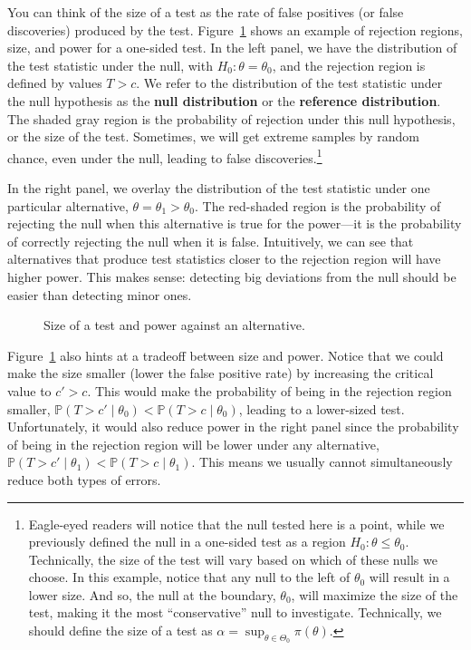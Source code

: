 \documentclass[
  13pt,
  letterpaper,
  DIV=11,
  numbers=noendperiod]{scrreprt}
\renewcommand{\P}{\mathbb{P}}
\theoremstyle{definition}
\theoremstyle{definition}
\theoremstyle{plain}
\theoremstyle{remark}
\begin{document}
You can think of the size of a test as the rate of false positives (or
false discoveries) produced by the test. Figure~\ref{fig-size-power}
shows an example of rejection regions, size, and power for a one-sided
test. In the left panel, we have the distribution of the test statistic
under the null, with \(H_0: \theta = \theta_0\), and the rejection
region is defined by values \(T > c\). We refer to the distribution of
the test statistic under the null hypothesis as the \textbf{null
distribution} or the \textbf{reference distribution}. The shaded gray
region is the probability of rejection under this null hypothesis, or
the size of the test. Sometimes, we will get extreme samples by random
chance, even under the null, leading to false discoveries.\footnote{Eagle-eyed
  readers will notice that the null tested here is a point, while we
  previously defined the null in a one-sided test as a region
  \(H_0: \theta \leq \theta_0\). Technically, the size of the test will
  vary based on which of these nulls we choose. In this example, notice
  that any null to the left of \(\theta_0\) will result in a lower size.
  And so, the null at the boundary, \(\theta_0\), will maximize the size
  of the test, making it the most ``conservative'' null to investigate.
  Technically, we should define the size of a test as
  \(\alpha = \sup_{\theta \in \Theta_0} \pi(\theta)\).}

In the right panel, we overlay the distribution of the test statistic
under one particular alternative, \(\theta = \theta_1 > \theta_0\). The
red-shaded region is the probability of rejecting the null when this
alternative is true for the power---it is the probability of correctly
rejecting the null when it is false. Intuitively, we can see that
alternatives that produce test statistics closer to the rejection region
will have higher power. This makes sense: detecting big deviations from
the null should be easier than detecting minor ones.

\begin{figure}[th]


\caption{\label{fig-size-power}Size of a test and power against an
alternative.}

\end{figure}%

Figure~\ref{fig-size-power} also hints at a tradeoff between size and
power. Notice that we could make the size smaller (lower the false
positive rate) by increasing the critical value to \(c' > c\). This
would make the probability of being in the rejection region smaller,
\(\P(T > c' \mid \theta_0) < \P(T > c \mid \theta_0)\), leading to a
lower-sized test. Unfortunately, it would also reduce power in the right
panel since the probability of being in the rejection region will be
lower under any alternative,
\(\P(T > c' \mid \theta_1) < \P(T > c \mid \theta_1)\). This means we
usually cannot simultaneously reduce both types of errors.
\end{document}
